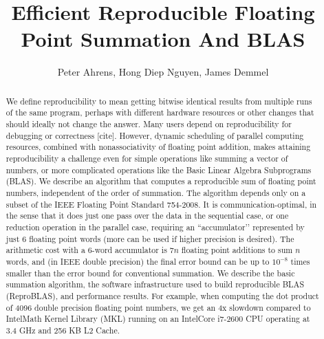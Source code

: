 \documentclass[12pt]{article}
\author{Peter Ahrens, Hong Diep Nguyen, James Demmel}
\title{Efficient Reproducible Floating Point Summation And BLAS}
\theoremstyle{definition}
\numberwithin{equation}{section}
\numberwithin{figure}{section}
\begin{document}
\noindent
\maketitle
\begin{abstract}
We define reproducibility to mean getting bitwise identical results from
multiple runs of the same program, perhaps with different hardware resources or other
changes that should ideally not change the answer. Many users depend on reproducibility
for debugging or correctness [cite]. However, dynamic scheduling of parallel computing
resources, combined with nonassociativity of floating point addition, makes attaining
reproducibility a challenge even for simple operations like summing a vector of numbers,
or more complicated operations like the Basic Linear Algebra Subprograms (BLAS).
We describe an algorithm that computes a reproducible sum of floating point numbers,
independent of the order of summation. The algorithm depends only on a subset of
the IEEE Floating Point Standard 754-2008. It is communication-optimal, in the sense that
it does just one pass over the data in the sequential case, or one reduction operation in
the parallel case, requiring an ``accumulator’’ represented by just 6 floating point words
(more can be used if higher precision is desired). The arithmetic cost with a 6-word
accumulator is $7n$ floating point additions to sum $n$ words, and (in IEEE double precision) the
final error bound can be up to $10^{-8}$ times smaller than the error bound for conventional
summation. We describe the basic summation algorithm, the software infrastructure used to
build reproducible BLAS (ReproBLAS), and performance results. For example, when computing the dot product of 4096 double precision floating point numbers, we get an
4x slowdown compared to Intel\textregistered Math Kernel Library (MKL) running on an Intel\textregistered Core i7-2600 CPU operating at 3.4 GHz and 256 KB L2 Cache.
\end{abstract}
\newpage
\tableofcontents
\newpage












\end{document}
